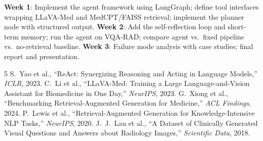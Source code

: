 \documentclass[10pt,twocolumn,letterpaper]{article}
\begin{document}
\textbf{Week 1}: Implement the agent framework using LangGraph; define tool interfaces wrapping LLaVA-Med and MedCPT/FAISS retrieval; implement the planner node with structured output.
\textbf{Week 2}: Add the self-reflection loop and short-term memory; run the agent on VQA-RAD; compare agent vs.\ fixed pipeline vs.\ no-retrieval baseline.
\textbf{Week 3}: Failure mode analysis with case studies; final report and presentation.

\vspace{-2pt}
{\small

\begin{thebibliography}{5}
\setlength{\itemsep}{0pt}
\setlength{\parsep}{0pt}
 S.~Yao et al., ``ReAct: Synergizing Reasoning and Acting in Language Models,'' \textit{ICLR}, 2023.
 C.~Li et al., ``LLaVA-Med: Training a Large Language-and-Vision Assistant for Biomedicine in One Day,'' \textit{NeurIPS}, 2023.
 G.~Xiong et al., ``Benchmarking Retrieval-Augmented Generation for Medicine,'' \textit{ACL Findings}, 2024.
 P.~Lewis et al., ``Retrieval-Augmented Generation for Knowledge-Intensive NLP Tasks,'' \textit{NeurIPS}, 2020.
 J.~J.~Lau et al., ``A Dataset of Clinically Generated Visual Questions and Answers about Radiology Images,'' \textit{Scientific Data}, 2018.
\end{thebibliography}
}
\end{document}
